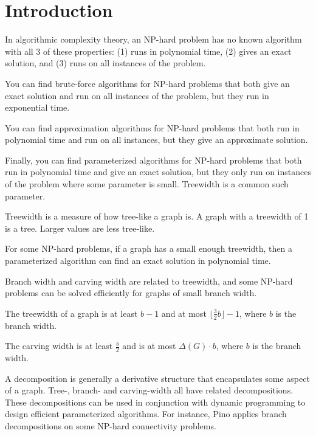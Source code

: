 \documentclass{article}
\begin{document}

\section{Introduction}

	In algorithmic complexity theory, an NP-hard problem has no known algorithm with all 3 of these properties: (1) runs in polynomial time, (2) gives an exact solution, and (3) runs on all instances of the problem.

	You can find brute-force algorithms for NP-hard problems that both give an exact solution and run on all instances of the problem, but they run in exponential time.

	You can find approximation algorithms for NP-hard problems that both run in polynomial time and run on all instances, but they give an approximate solution.

	Finally, you can find parameterized algorithms for NP-hard problems that both run in polynomial time and give an exact solution, but they only run on instances of the problem where some parameter is small. Treewidth is a common such parameter.

	Treewidth is a measure of how tree-like a graph is. A graph with a treewidth of 1 is a tree. Larger values are less tree-like.

	For some NP-hard problems, if a graph has a small enough treewidth, then a parameterized algorithm can find an exact solution in polynomial time.

	Branch width and carving width are related to treewidth, and some NP-hard problems can be solved efficiently for graphs of small branch width.
	
	The treewidth of a graph is at least $b-1$ and at most $\lfloor \frac{3}{2} b\rfloor-1$, where $b$ is the branch width.\cite{RS91}

	The carving width is at least $\frac{b}{2}$ and is at most $\Delta(G) \cdot b$, where $b$ is the branch width.\cite{ED18}

	A decomposition is generally a derivative structure that encapsulates some aspect of a graph. Tree-, branch- and carving-width all have related decompositions. These decompositions can be used in conjunction with dynamic programming to design efficient parameterized algorithms. For instance, Pino\cite{Pin16} applies branch decompositions on some NP-hard connectivity problems.
\end{document}
